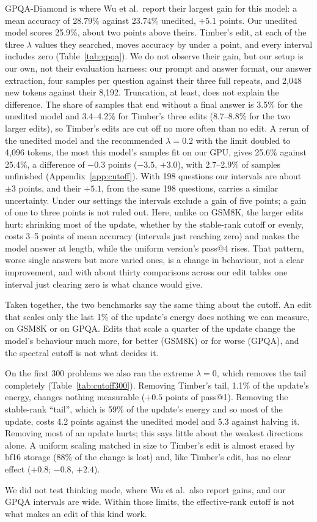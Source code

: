 GPQA-Diamond is where Wu et al.\ report their largest gain for this model: a
mean accuracy of 28.79\% against 23.74\% unedited, $+5.1$ points. Our
unedited model scores 25.9\%, about two points above theirs. Timber's edit, at
each of the three $\lambda$ values they searched, moves accuracy by under a
point, and every interval includes zero (Table~\ref{tab:gpqa}). We do not
observe their gain, but our setup is our own, not their evaluation harness:
our prompt and answer format, our answer extraction, four samples per
question against their three full repeats, and 2{,}048 new tokens against
their 8{,}192. Truncation, at least, does not explain the difference. The
share of samples that end without a final answer is 3.5\% for the unedited
model and 3.4--4.2\% for Timber's three edits (8.7--8.8\% for the two larger
edits), so Timber's edits are cut off no more often than no edit. A rerun of
the unedited model and the recommended $\lambda=0.2$ with the limit doubled
to 4{,}096 tokens, the most this model's samples fit on our GPU, gives 25.6\%
against 25.4\%, a difference of $-0.3$ points ($-3.5$, $+3.0$), with
2.7--2.9\% of samples unfinished (Appendix~\ref{app:cutoff}). With 198
questions our intervals are about $\pm3$ points, and their $+5.1$, from the
same 198 questions, carries a similar uncertainty. Under our settings the
intervals exclude a gain of five points; a gain of one to three points is not
ruled out. Here, unlike on GSM8K, the larger edits hurt: shrinking most of
the update, whether by the stable-rank cutoff or
evenly, costs 3--5 points of mean accuracy (intervals just reaching zero) and
makes the model answer at length, while the uniform version's pass@4 rises.
That pattern, worse single answers but more varied ones, is a change in
behaviour, not a clear improvement, and with about thirty comparisons across
our edit tables one interval just clearing zero is what chance would give.

Taken together, the two benchmarks say the same thing about the cutoff. An
edit that scales only the last 1\% of the update's energy does nothing we can
measure, on GSM8K or on GPQA. Edits that scale a quarter of the update change
the model's behaviour much more, for better (GSM8K) or for worse (GPQA), and
the spectral cutoff is not what decides it.

On the first 300 problems we also ran the extreme $\lambda=0$, which removes
the tail completely (Table~\ref{tab:cutoff300}). Removing Timber's tail, 1.1\%
of the update's energy, changes nothing measurable ($+0.5$ points of pass@1).
Removing the stable-rank ``tail'', which is 59\% of the update's energy and so
most of the update, costs 4.2 points against the unedited model and 5.3 against
halving it. Removing most of an update hurts; this says little about the
weakest directions alone. A uniform scaling matched in size to Timber's edit is
almost erased by bf16 storage (88\% of the change is lost) and, like Timber's
edit, has no clear effect ($+0.8$; $-0.8$, $+2.4$).

We did not test thinking mode, where Wu et al.\ also report gains, and our
GPQA intervals are wide. Within those limits, the effective-rank cutoff is not
what makes an edit of this kind work.
